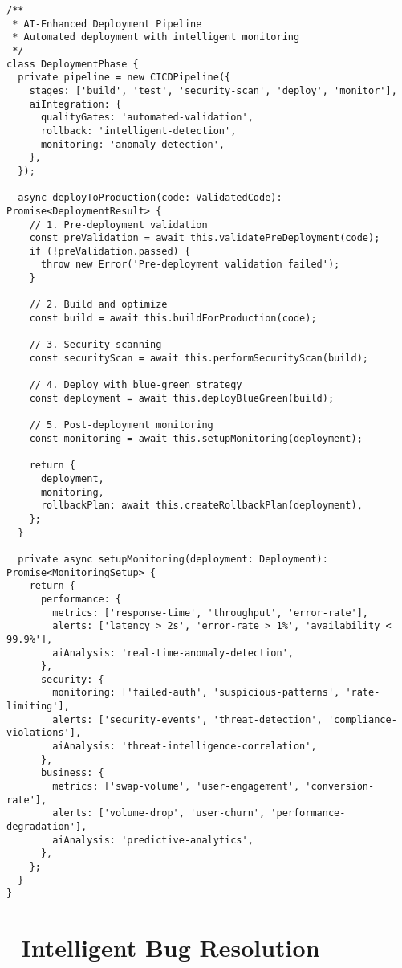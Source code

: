 \documentclass[11pt,a4paper]{article}
\begin{document}
\begin{lstlisting}[style=typescript, caption=CI/CD Pipeline with AI Integration]
/**
 * AI-Enhanced Deployment Pipeline
 * Automated deployment with intelligent monitoring
 */
class DeploymentPhase {
  private pipeline = new CICDPipeline({
    stages: ['build', 'test', 'security-scan', 'deploy', 'monitor'],
    aiIntegration: {
      qualityGates: 'automated-validation',
      rollback: 'intelligent-detection',
      monitoring: 'anomaly-detection',
    },
  });

  async deployToProduction(code: ValidatedCode): Promise<DeploymentResult> {
    // 1. Pre-deployment validation
    const preValidation = await this.validatePreDeployment(code);
    if (!preValidation.passed) {
      throw new Error('Pre-deployment validation failed');
    }

    // 2. Build and optimize
    const build = await this.buildForProduction(code);

    // 3. Security scanning
    const securityScan = await this.performSecurityScan(build);

    // 4. Deploy with blue-green strategy
    const deployment = await this.deployBlueGreen(build);

    // 5. Post-deployment monitoring
    const monitoring = await this.setupMonitoring(deployment);

    return {
      deployment,
      monitoring,
      rollbackPlan: await this.createRollbackPlan(deployment),
    };
  }

  private async setupMonitoring(deployment: Deployment): Promise<MonitoringSetup> {
    return {
      performance: {
        metrics: ['response-time', 'throughput', 'error-rate'],
        alerts: ['latency > 2s', 'error-rate > 1%', 'availability < 99.9%'],
        aiAnalysis: 'real-time-anomaly-detection',
      },
      security: {
        monitoring: ['failed-auth', 'suspicious-patterns', 'rate-limiting'],
        alerts: ['security-events', 'threat-detection', 'compliance-violations'],
        aiAnalysis: 'threat-intelligence-correlation',
      },
      business: {
        metrics: ['swap-volume', 'user-engagement', 'conversion-rate'],
        alerts: ['volume-drop', 'user-churn', 'performance-degradation'],
        aiAnalysis: 'predictive-analytics',
      },
    };
  }
}
\end{lstlisting}

\section{🔧 Intelligent Bug Resolution}
\end{document}
